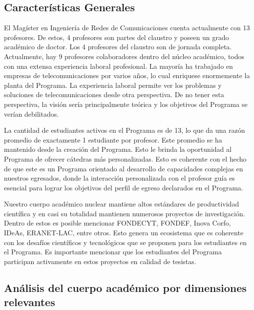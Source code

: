 \subsection{Características Generales}


El Magíster en Ingeniería de Redes de Comunicaciones cuenta actualmente con 13 profesores. De estos, 4 profesores son partes del claustro 
y poseen un grado académico de doctor. Los 4 profesores del claustro son de jornada
completa. Actualmente, hay 9 profesores colaboradores dentro del núcleo académico, todos con una extensa 
experiencia laboral profesional. La mayoría ha trabajado en empresas de telecomunicaciones por varios años,
lo cual enriquese enormemente la planta del Programa. La experiencia laboral permite ver los problemas y soluciones de 
telecomunicaciones desde otra perspectiva. De no tener esta perspectiva, la visión sería principalmente teórica 
y los objetivos del Programa se verían debilitados. 

La cantidad de estudiantes activos en el Programa es de 13, lo que da una razón promedio de exactamente
1 estudiante por profesor. Este promedio se ha mantenido desde la creación del Programa. Esto le brinda la 
oportunidad al Programa de ofrecer cátedras más personalizadas. Esto es coherente con el hecho de que este es un Programa orientado
al desarrollo de capacidades complejas en nuestros egresados, donde la interacción personalizada
con el profesor guía es esencial para lograr los objetivos del perfil de egreso declarados en el Programa.

Nuestro cuerpo académico nuclear mantiene altos estándares de productividad científica y en
casi su totalidad mantienen numerosos proyectos de investigación. Dentro de estos es posible
mencionar FONDECYT, FONDEF, Inova Corfo, IDeAs, ERANET-LAC, entre otros. Esto genera un ecosistema que es coherente con los
desafíos científicos y tecnológicos que se proponen para los estudiantes en el Programa. Es importante mencionar
que los estudiantes del Programa participan activamente en estos proyectos en calidad de tesistas.


\subsection{Análisis del cuerpo académico por dimensiones relevantes}

